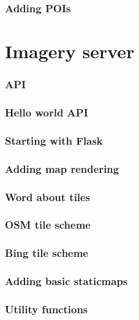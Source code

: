 \documentclass{beamer}
\begin{document}
\begin{frame}
  \frametitle{Adding POIs}

\end{frame}


\section{Imagery server}

\begin{frame}
  \frametitle{API}

\end{frame}

\begin{frame}[fragile]
  \frametitle{Hello world API}
\end{frame}

\begin{frame}
  \frametitle{Starting with Flask}

\end{frame}

\begin{frame}
  \frametitle{Adding map rendering}

\end{frame}

\begin{frame}
  \frametitle{Word about tiles}

\end{frame}

\begin{frame}
  \frametitle{OSM tile scheme}

\end{frame}

\begin{frame}
  \frametitle{Bing tile scheme}

\end{frame}

\begin{frame}
  \frametitle{Adding basic staticmaps}

\end{frame}

\begin{frame}
  \frametitle{Utility functions}

\end{frame}


\end{document}
